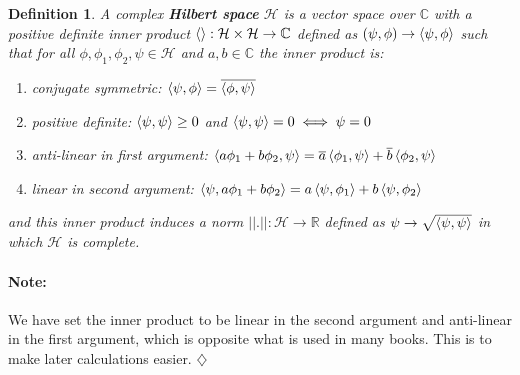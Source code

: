 \documentclass[12pt,twoside,fleqn]{report}
\theoremstyle{thmstyle}
\newtheorem{defn}{Definition}[chapter]
\newenvironment{note}{\paragraph{\textbf{Note:}}}{\hfill\ensuremath{\diamondsuit}}
\begin{document}
\begin{samepage}
\begin{defn}
    A complex \textbf{Hilbert space} $\mathcal{H}$ is a vector space over $\mathbb{C}$ with a positive definite inner product $\braket{} : \mathcal{H} \times \mathcal{H} \to \mathbb{C}$ defined as $(\psi,\phi) \to \braket{\psi,\phi}$ such that for all $\phi, \phi_1, \phi_2, \psi \in \mathcal{H}$ and $a, b \in \mathbb{C}$ the inner product is:
    \begin{enumerate}
        \item conjugate symmetric: $\braket{\psi,\phi} = \overline{\braket{\phi,\psi}}$
        \item positive definite: $\braket{\psi, \psi} \geq 0$ and $\braket{\psi, \psi} = 0 \iff \psi = 0$
        \item anti-linear in first argument: $\braket{a \phi_1 + b \phi_2, \psi} = \overline{a} \braket{\phi_1, \psi} + \overline{b} \braket{\phi_2, \psi}$
        \item linear in second argument: $\braket{\psi, a \phi_1 + b \phi_2} = a \braket{\psi,\phi_1} + b \braket{\psi,\phi_2}$
    \end{enumerate}
    and this inner product induces a norm $||.|| : \mathcal{H} \to \mathbb{R}$ defined as $\psi \to \sqrt{\braket{\psi,\psi}}$ in which $\mathcal{H}$ is complete.
\end{defn}

\begin{note}
    We have set the inner product to be linear in the second argument and anti-linear in the first argument, which is opposite what is used in many books. This is to make later calculations easier.
\end{note}
\end{samepage}
\end{document}
